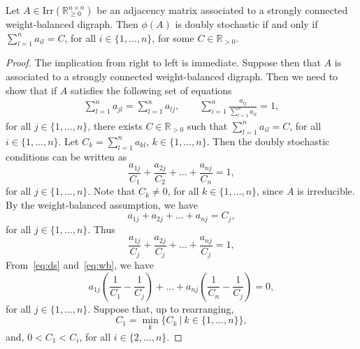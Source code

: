 \documentclass[final]{siamltex}
\begin{document}
\begin{theorem}\label{theorem:dsable_wbs}
  Let $ A \in \mathrm{Irr}(\mathbb{R}_{\geq 0}^{n\times n}) $ be an
  adjacency matrix associated to a strongly connected weight-balanced
  digraph.  Then $ \phi(A) $ is doubly stochastic if and only if $
  \sum_{l=1}^na_{il}=C $, for all $ i \in \{1,\ldots, n\} $, for some
  $ C \in \mathbb{R}_{> 0}$.
\end{theorem}
\begin{proof}
  The implication from right to left is immediate. Suppose then that $
  A $ is associated to a strongly connected weight-balanced
  digraph. Then we need to show that if $ A $ satisfies the following
  set of equations
  \begin{align*}
    \sum_{l=1}^na_{jl}=\sum_{l=1}^na_{lj},\qquad
    \sum_{i=1}^n\frac{a_{ij}}{\sum_{l=1}^na_{il}}=1,
  \end{align*}
  for all $ j\in\{1,\ldots, n\} $, there exists $ C \in
  \mathbb{R}_{> 0} $ such that $ \sum_{l=1}^na_{il}=C $, for all $ i
  \in \{1,\ldots, n\} $. Let $ C_{k}=\sum_{l=1}^na_{kl}$,
  $ k\in\{1,\ldots, n\} $. Then the doubly stochastic conditions can
  be written as
  \begin{equation}\label{eq:ds}
    \frac{a_{1j}}{C_1}+\frac{a_{2j}}{C_2}+\dots+\frac{a_{nj}}{C_n}=1,
  \end{equation}
  for all $ j\in \{1,\ldots, n\} $. Note that $ C_k\neq 0 $, for all $
  k\in\{1,\ldots, n\} $, since $ A $ is irreducible. By
  the weight-balanced assumption, we have
  \[
  a_{1j}+a_{2j}+\dots+a_{nj}=C_j,
  \]
  for all $ j\in \{1,\ldots, n\} $. Thus
  \begin{equation}\label{eq:wb}
    \frac{a_{1j}}{C_j}+\frac{a_{2j}}{C_j}+\dots+\frac{a_{nj}}{C_j}=1,
  \end{equation}
  From~\eqref{eq:ds} and~\eqref{eq:wb}, we have
  \begin{equation}\label{eq:main}
    a_{1j}\left(\frac{1}{C_1}-\frac{1}{C_j}\right)+\dots+a_{nj}  
    \left(\frac{1}{C_n}-\frac{1}{C_j}\right)
    =0,
  \end{equation}
  for all $ j\in \{1,\ldots, n\} $.  Suppose that, up to rearranging,
  \[
  C_1=\min_{k}\{C_k \ | \ k\in\{1,\ldots, n\}\},
  \]
  and, $ 0<C_1<C_i $, for all $ i \in\{2,\dots, n\}$. 
    

\end{proof}
\end{document}
